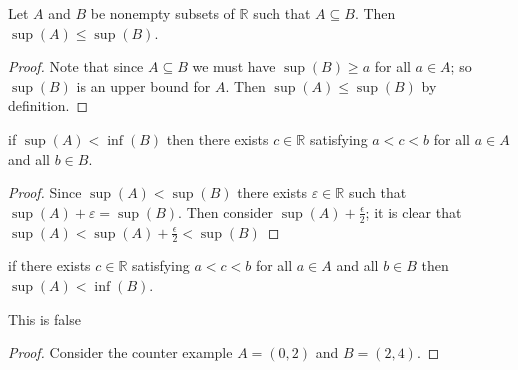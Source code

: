 \documentclass[11pt,largemargins]{homework}
\newcommand{\R}{\mathbb{R}}
\newcommand{\eps}{\varepsilon}
\begin{document}
\begin{alphaparts}
    \questionpart
    Let $A$ and $B$ be nonempty subsets of $\R$ such that $A \subseteq B$. Then $\sup(A) \leq \sup(B)$. 

    \begin{proof}
        Note that since $A \subseteq B$ we must have $\sup(B) \geq a$ for all $a \in A$; so $\sup(B)$ is an upper bound for $A$. Then $\sup(A) \leq \sup(B)$ by definition. 
    \end{proof}

    \questionpart
    if $\sup(A) < \inf(B)$ then there exists $c \in \R$ satisfying $a < c < b$ for all $a \in A$ and all $b \in B$. 

    \begin{proof}
        Since $\sup(A) < \sup(B)$ there exists $\eps \in \R$ such that $\sup(A) +  \eps = \sup(B)$. Then consider $\sup(A) + \frac{\epsilon}{2}$; it is clear that $\sup(A) < \sup(A) + \frac{\epsilon}{2} < \sup(B)$
    \end{proof}

    \questionpart
    if there exists $c \in \R$ satisfying $a < c < b$ for all $a \in A$ and all $b \in B$ then  $\sup(A) < \inf(B)$. 

    This is false
    \begin{proof}
        Consider the counter example $A = (0, 2)$ and $B = (2, 4)$. 
    \end{proof}
\end{alphaparts}
\end{document}
